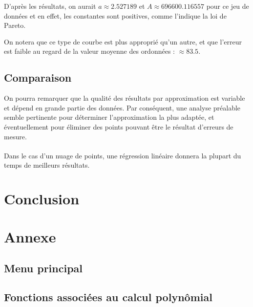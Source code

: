 \documentclass{report}
\begin{document}
        D'après les résultats, on aurait $a\approx2.527189$ et $A\approx696600.116557$ pour ce jeu de données et en effet, les constantes sont positives, comme l'indique la loi de Pareto.
        
        On notera que ce type de courbe est plus approprié qu'un autre, et que l'erreur est faible au regard de la valeur moyenne des ordonnées : $\approx 83.5$.
    \section{Comparaison}
      On pourra remarquer que la qualité des résultats par approximation est variable et dépend en grande partie des données. Par conséquent, une analyse préalable semble pertinente pour déterminer l'approximation la plus adaptée, et éventuellement pour éliminer des points pouvant être le résultat d'erreurs de mesure.\\ \\
      Dans le cas d'un nuage de points, une régression linéaire donnera la plupart du temps de meilleurs résultats.
  \chapter{Conclusion}
  
  \chapter{Annexe}
    \section{Menu principal}
      
    \section{Fonctions associées au calcul polynômial}
      
      
\end{document}

